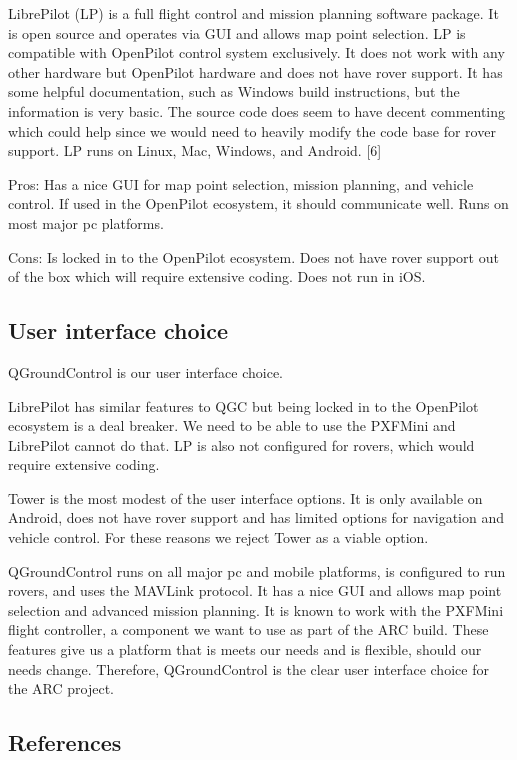 \documentclass[compsoc,draftclsnofoot,onecolumn,10pt]{IEEEtran}
\begin{document}
LibrePilot (LP) is a full flight control and mission planning software
package. It is open source and operates via GUI and allows map point selection.
LP is compatible with OpenPilot control system exclusively. It does not
work with any other hardware but OpenPilot hardware and does not have rover
support. It has some helpful documentation, such as Windows build instructions,
but the information is very basic. The source code does seem to have decent
commenting which could help since we would need to heavily modify the code base
for rover support. LP runs on Linux, Mac, Windows, and Android. [6]

Pros: Has a nice GUI for map point selection, mission planning, and vehicle
control. If used in the OpenPilot ecosystem, it should communicate well. Runs
on most major pc platforms.

Cons: Is locked in to the OpenPilot ecosystem. Does not have rover support out
of the box which will require extensive coding. Does not run in iOS.

\subsection{User interface choice}
QGroundControl is our user interface choice.\par
LibrePilot has similar features to QGC but being locked in to the OpenPilot
ecosystem is a deal breaker. We need to be able to use the PXFMini and
LibrePilot cannot do that. LP is also not configured for rovers, which would
require extensive coding.\par
Tower is the most modest of the user interface options. It is only available on
Android, does not have rover support and has limited options for navigation and
vehicle control. For these reasons we reject Tower as a viable option.\par
QGroundControl runs on all major pc and mobile platforms, is configured to run
rovers, and uses the MAVLink protocol. It has a nice GUI and allows map point
selection and advanced mission planning. It is known to work with the PXFMini
flight controller, a component we want to use as part of the ARC build. These
features give us a platform that is meets our needs and is flexible, should our
needs change. Therefore, QGroundControl is the clear user interface choice for
the ARC project.

\subsection{References}
\end{document}
